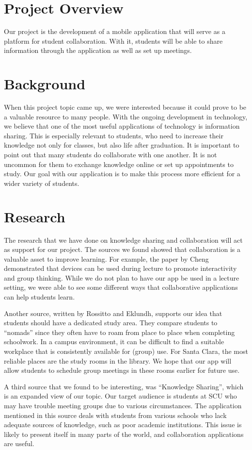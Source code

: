 \section{Project Overview}

Our project is the development of a mobile application that will serve as a platform for student collaboration. With it, students will be able to share information through the application as well as set up meetings.

\section{Background}

When this project topic came up, we were interested because it could prove to be a valuable resource to many people. With the ongoing development in technology, we believe that one of the most useful applications of technology is information sharing. This is especially relevant to students, who need to increase their knowledge not only for classes, but also life after graduation. It is important to point out that many students do collaborate with one another. It is not uncommon for them to exchange knowledge online or set up appointments to study. Our goal with our application is to make this process more efficient for a wider variety of students.

\section{Research}

The research that we have done on knowledge sharing and collaboration will act as support for our project. The sources we found showed that collaboration is a valuable asset to improve learning. For example, the paper by Cheng demonstrated that devices can be used during lecture to promote interactivity and group thinking. While we do not plan to have our app be used in a lecture setting, we were able to see some different ways that collaborative applications can help students learn.

Another source, written by Rossitto and Eklundh, supports our idea that students should have a dedicated study area. They compare students to “nomads” since they often have to roam from place to place when completing schoolwork. In a campus environment, it can be difficult to find a suitable workplace that is consistently available for (group) use. For Santa Clara, the most reliable places are the study rooms in the library. We hope that our app will allow students to schedule group meetings in these rooms earlier for future use.

A third source that we found to be interesting, was “Knowledge Sharing”, which is an expanded view of our topic. Our target audience is students at SCU who may have trouble meeting groups due to various circumstances. The application mentioned in this source deals with students from various schools who lack adequate sources of knowledge, such as poor academic institutions. This issue is likely to present itself in many parts of the world, and collaboration applications are useful.